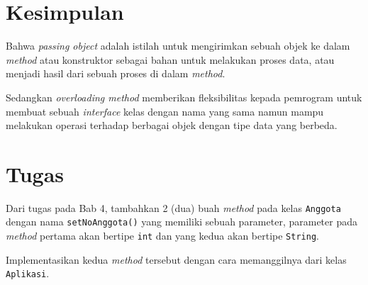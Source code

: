 \section{Kesimpulan}

Bahwa \textit{passing object} adalah istilah untuk mengirimkan sebuah objek ke dalam \textit{method} atau konstruktor sebagai bahan untuk melakukan proses data, atau menjadi hasil dari sebuah proses di dalam \textit{method}.

Sedangkan \textit{overloading method} memberikan fleksibilitas kepada pemrogram untuk membuat sebuah \textit{interface} kelas dengan nama yang sama namun mampu melakukan operasi terhadap berbagai objek dengan tipe data yang berbeda.

\section{Tugas}

Dari tugas pada Bab 4, tambahkan 2 (dua) buah \textit{method} pada kelas \texttt{Anggota} dengan nama \texttt{setNoAnggota()} yang memiliki sebuah parameter, parameter pada \textit{method} pertama akan bertipe \texttt{int} dan yang kedua akan bertipe \texttt{String}.

Implementasikan kedua \textit{method} tersebut dengan cara memanggilnya dari kelas \texttt{Aplikasi}.